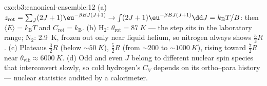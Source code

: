\begin{solution}{exo:b3:canonical-ensemble:12}
(a) $z_{\text{rot}} = \sum_J(2J+1)\eu^{-\beta BJ(J+1)}
\to \int(2J+1)\eu^{-\beta BJ(J+1)}\dd J = k_{\text{B}}T/B$: then
$\langle E\rangle = k_{\text{B}}T$ and $C_{\text{rot}} =
k_{\text{B}}$. (b) H$_2$: $\theta_{\text{rot}} = \qty{87}{K}$ ---
the step sits in the laboratory range; N$_2$: \qty{2.9}{K},
frozen out only near liquid helium, so nitrogen always shows
$\tfrac52 R$. (c) Plateaus $\tfrac32 R$ (below $\sim\qty{50}{K}$),
$\tfrac52 R$ (from $\sim200$ to $\sim\qty{1000}{K}$), rising
toward $\tfrac72 R$ near $\theta_{\text{vib}} \approx
\qty{6000}{K}$. (d) Odd and even $J$ belong to different nuclear
spin species that interconvert slowly, so cold hydrogen's $C_V$
depends on its ortho--para history --- nuclear statistics audited
by a calorimeter.
\end{solution}

